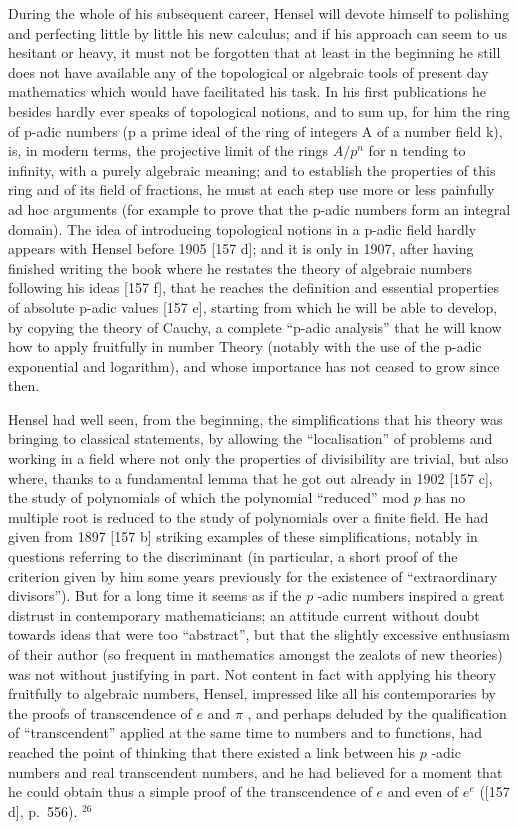 During the whole of his subsequent career, Hensel will devote himself to polishing and perfecting little by little his new calculus; and if his approach can seem to us hesitant or heavy, it must not be forgotten that at least in the beginning he still does not have available any of the topological or algebraic tools of present day mathematics which would have facilitated his task. In his first publications he besides hardly ever speaks of topological notions, and to sum up, for him the ring of p-adic numbers (p a prime ideal of the ring of integers A of a number field k), is, in modern terms, the projective limit of the rings \(A/p^{n}\) for n tending to infinity, with a purely algebraic meaning; and to establish the properties of this ring and of its field of fractions, he must at each step use more or less painfully ad hoc arguments (for example to prove that the p-adic numbers form an integral domain). The idea of introducing topological notions in a p-adic field hardly appears with Hensel before 1905 {[}157 d{]}; and it is only in 1907, after having finished writing the book where he restates the theory of algebraic numbers following his ideas {[}157 f{]}, that he reaches the definition and essential properties of absolute p-adic values {[}157 e{]}, starting from which he will be able to develop, by copying the theory of Cauchy, a complete ``p-adic analysis'' that he will know how to apply fruitfully in number Theory (notably with the use of the p-adic exponential and logarithm), and whose importance has not ceased to grow since then.

Hensel had well seen, from the beginning, the simplifications that his theory was bringing to classical statements, by allowing the ``localisation'' of problems and working in a field where not only the properties of divisibility are trivial, but also where, thanks to a fundamental lemma that he got out already in 1902 {[}157 c{]}, the study of polynomials of which the polynomial ``reduced'' mod \(p\) has no multiple root is reduced to the study of polynomials over a finite field. He had given from 1897 {[}157 b{]} striking examples of these simplifications, notably in questions referring to the discriminant (in particular, a short proof of the criterion given by him some years previously for the existence of ``extraordinary divisors''). But for a long time it seems as if the \(p\) -adic numbers inspired a great distrust in contemporary mathematicians; an attitude current without doubt towards ideas that were too ``abstract'', but that the slightly excessive enthusiasm of their author (so frequent in mathematics amongst the zealots of new theories) was not without justifying in part. Not content in fact with applying his theory fruitfully to algebraic numbers, Hensel, impressed like all his contemporaries by the proofs of transcendence of \(e\) and \(\pi\) , and perhaps deluded by the qualification of ``transcendent'' applied at the same time to numbers and to functions, had reached the point of thinking that there existed a link between his \(p\) -adic numbers and real transcendent numbers, and he had believed for a moment that he could obtain thus a simple proof of the transcendence of \(e\) and even of \(e^e\) ({[}157 d{]}, p.~556). \(^{26}\)

